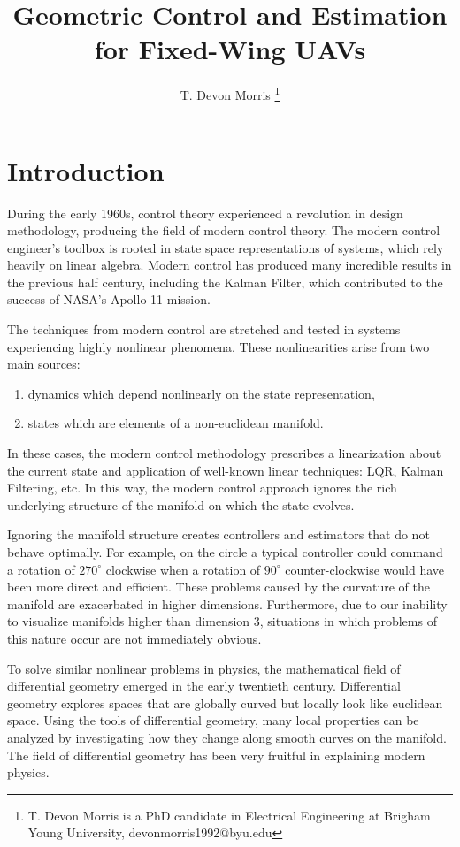 \documentclass[letterpaper, 10 pt, conference]{ieeeconf}  %
\title{Geometric Control and Estimation for Fixed-Wing UAVs}
\author{T. Devon Morris%
    \thanks{T. Devon Morris is a PhD candidate in Electrical Engineering at Brigham Young University, devonmorris1992@byu.edu}}
\begin{document}
\maketitle 
\section{Introduction}
During the early 1960s, control theory experienced a revolution in design methodology, producing the field of modern control theory. The modern control engineer's toolbox is rooted in state space representations of systems, which rely heavily on linear algebra. Modern control has produced many incredible results in the previous half century, including the Kalman Filter, which contributed to the success of NASA's Apollo 11 mission.

The techniques from modern control are stretched and tested in systems experiencing highly nonlinear phenomena. These nonlinearities arise from two main sources:
\begin{enumerate}
  \item dynamics which depend nonlinearly on the state representation,
  \item states which are elements of a non-euclidean manifold.
\end{enumerate}
In these cases, the modern control methodology prescribes a linearization about the current state and application of well-known linear techniques: LQR, Kalman Filtering, etc. In this way, the modern control approach ignores the rich underlying structure of the manifold on which the state evolves.

Ignoring the manifold structure creates controllers and estimators that do not behave optimally. For example, on the circle a typical controller could command a rotation of $270^{\circ}$ clockwise when a rotation of $90^{\circ}$ counter-clockwise would have been more direct and efficient. These problems caused by the curvature of the manifold are exacerbated in higher dimensions. Furthermore, due to our inability to visualize manifolds higher than dimension 3, situations in which problems of this nature occur are not immediately obvious.

To solve similar nonlinear problems in physics, the mathematical field of differential geometry emerged in the early twentieth century. Differential geometry explores spaces that are globally curved but locally look like euclidean space. Using the tools of differential geometry, many local properties can be analyzed by investigating how they change along smooth curves on the manifold. The field of differential geometry has been very fruitful in explaining modern physics. 
  
\end{document}
